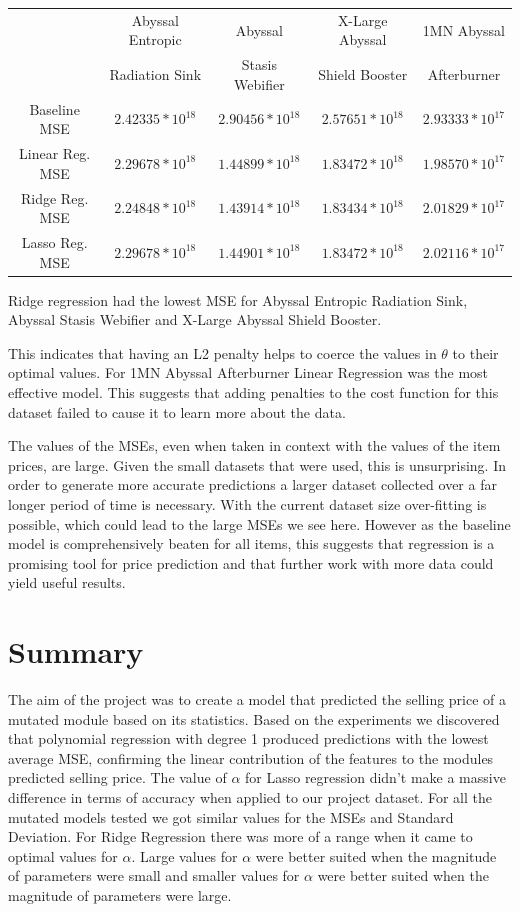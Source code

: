 \documentclass[10pt]{article}
\begin{document}
		\medskip
		
		\begin{tabular}{|c|c|c|c|c|}
			\hline
			& Abyssal Entropic & Abyssal & X-Large Abyssal & 1MN Abyssal\\
			& Radiation Sink & Stasis Webifier & Shield Booster & Afterburner\\
			\hline
			Baseline MSE & $2.42335*10^{18}$ & $2.90456*10^{18}$ & $2.57651*10^{18}$ & $2.93333*10^{17}$\\
			Linear Reg. MSE & $2.29678*10^{18}$ & $1.44899*10^{18}$ & $1.83472*10^{18}$ & $1.98570*10^{17}$\\
			Ridge Reg. MSE & $2.24848*10^{18}$ & $1.43914*10^{18}$ & $1.83434*10^{18}$ & $2.01829*10^{17}$\\
			Lasso Reg. MSE & $2.29678*10^{18}$ & $1.44901*10^{18}$ & $1.83472*10^{18}$ & $2.02116*10^{17}$\\
			\hline
		\end{tabular}
	
		\medskip
	
		Ridge regression had the lowest MSE for Abyssal Entropic Radiation Sink, Abyssal Stasis Webifier and X-Large Abyssal Shield Booster.
		
		This indicates that having an L2 penalty helps to coerce the values in $\theta$ to their optimal values. For 1MN Abyssal Afterburner Linear Regression was the most effective model. This suggests that adding penalties to the cost function for this dataset failed to cause it to learn more about the data.
		
		The values of the MSEs, even when taken in context with the values of the item prices, are large. Given the small datasets that were used, this is unsurprising. In order to generate more accurate predictions a larger dataset collected over a far longer period of time is necessary. With the current dataset size over-fitting is possible, which could lead to the large MSEs we see here. However as the baseline model is comprehensively beaten for all items, this suggests that regression is a promising tool for price prediction and that further work with more data could yield useful results.
		
\section{Summary}
	The aim of the project was to create a model that predicted the selling price of a mutated module based on its statistics. Based on the experiments we discovered that polynomial regression with degree 1 produced predictions with the lowest average MSE, confirming the linear contribution of the features to the modules predicted selling price. The value of $\alpha$ for Lasso regression didn’t make a massive difference in terms of accuracy when applied to our project dataset. For all the mutated models tested we got similar values for the MSEs and Standard Deviation. For Ridge Regression there was more of a range when it came to optimal values for $\alpha$. Large values for $\alpha$ were better suited when the magnitude of parameters were small and smaller values for $\alpha$ were better suited when the magnitude of parameters were large. 
	
\end{document}
